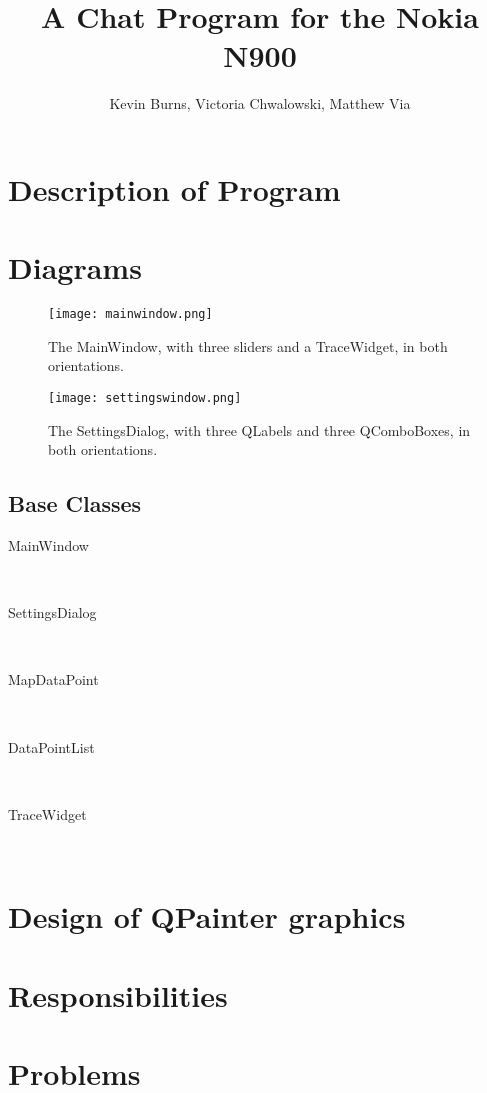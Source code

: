 \documentclass[12pt]{article}
\begin{document}
\title{A Chat Program for the Nokia N900}
\author{Kevin Burns, Victoria Chwalowski, Matthew Via}
\date{}
\maketitle

\section{Description of Program}

\section{Diagrams}
\begin{figure}[H]
  \centering
    \texttt{[image: mainwindow.png]}
  \caption{The MainWindow, with three sliders and a TraceWidget, in both
  orientations.}
\end{figure}

\begin{figure}[H]
  \centering
    \texttt{[image: settingswindow.png]}
  \caption{The SettingsDialog, with three QLabels and three QComboBoxes, in both
  orientations.}
\end{figure}

\subsection{Base Classes}
\begin{description}
\item[MainWindow] \hfill \\
\item[SettingsDialog] \hfill \\
\item[MapDataPoint] \hfill \\
\item[DataPointList] \hfill \\
\item[TraceWidget] \hfill \\
\end{description}

\section{Design of QPainter graphics}
\section{Responsibilities}
\section{Problems}
\end{document}
